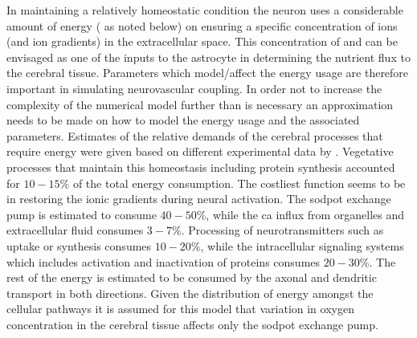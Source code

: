 In maintaining a relatively homeostatic condition the neuron uses a considerable amount of energy ( as noted below) on ensuring a specific concentration of ions (and ion gradients) in the extracellular space. This concentration of \pot and \na can be envisaged as one of the inputs to the astrocyte in determining the nutrient flux to the cerebral tissue. Parameters which model/affect the energy usage are therefore important in simulating neurovascular coupling. In order not to increase the complexity of the numerical model further than is necessary an approximation needs to be made on how to model the energy usage and the associated parameters. Estimates of the relative demands of the cerebral processes that require energy were given based on different experimental data by \citet{Ames2000}. Vegetative processes that maintain this homeostasis including protein synthesis accounted for $10-15$\% of the total energy consumption. The costliest function seems to be in restoring the ionic gradients during neural activation. The \gls{sodpot} exchange pump is estimated to consume $40-50$\%, while the \gls{ca} influx from organelles and extracellular fluid consumes $3-7$\%. Processing of neurotransmitters such as uptake or synthesis consumes $10-20$\%, while the intracellular signaling systems which includes activation and inactivation of proteins consumes $20-30$\%. The rest of the energy is estimated to be consumed by the axonal and dendritic transport in both directions. Given the distribution of energy amongst the cellular pathways it is assumed for this model that variation in oxygen concentration in the cerebral tissue affects only the \gls{sodpot} exchange pump. 

